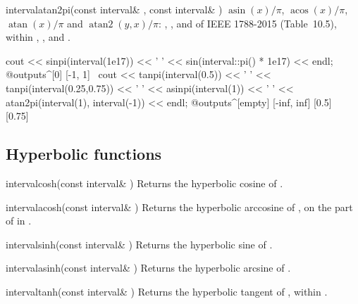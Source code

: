 \begin{deffun}{interval}{atan2pi}{(const interval\& , const interval\& )}
  $\operatorname{asin}(x)/\pi$, $\operatorname{acos}(x)/\pi$,
  $\operatorname{atan}(x)/\pi$ and $\operatorname{atan2}(y,x)/\pi$:
  , ,  and  of IEEE
  1788-2015 (Table~10.5), within , ,
   and .\newinvfive
\begin{example}
cout << sinpi(interval(1e17)) << ' '
     << sin(interval::pi() * 1e17) << endl;
@outputs^[0] [-1, 1]~
cout << tanpi(interval(0.5)) << ' '
     << tanpi(interval(0.25,0.75)) << ' '
     << asinpi(interval(1)) << ' '
     << atan2pi(interval(1), interval(-1)) << endl;
@outputs^[empty] [-inf, inf] [0.5] [0.75]~
\end{example}
\end{deffun}

\subsection{Hyperbolic functions}\label{sec:arithmetic-hyperbolic}
%

\begin{deffun}{interval}{cosh}{(const interval\& )}
  Returns the hyperbolic cosine of .
\end{deffun}

\begin{deffun}{interval}{acosh}{(const interval\& )}
  Returns the hyperbolic arccosine of , on the part of  in
  .
\end{deffun}

\begin{deffun}{interval}{sinh}{(const interval\& )}
  Returns the hyperbolic sine of .
\end{deffun}

\begin{deffun}{interval}{asinh}{(const interval\& )}
  Returns the hyperbolic arcsine of .
\end{deffun}

\begin{deffun}{interval}{tanh}{(const interval\& )}
  Returns the hyperbolic tangent of , within .
\end{deffun}

